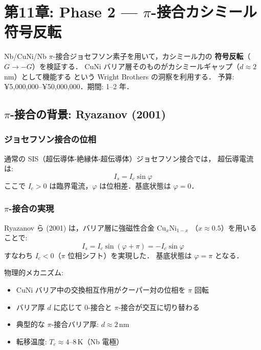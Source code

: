 \newpage
\section{第11章: Phase 2 — $\pi$-接合カシミール符号反転}

\begin{experimentbox}
Nb/CuNi/Nb $\pi$-接合ジョセフソン素子を用いて，カシミール力の
\textbf{符号反転}（$G \to -G$）を検証する．
CuNi バリア層そのものがカシミールギャップ（$d \approx 2$\,nm）として機能する
という Wright Brothers の洞察を利用する．
予算: ¥5,000,000--¥50,000,000．期間: 1--2 年．
\end{experimentbox}

\subsection{$\pi$-接合の背景: Ryazanov (2001)}

\subsubsection{ジョセフソン接合の位相}

通常の SIS（超伝導体-絶縁体-超伝導体）ジョセフソン接合では，
超伝導電流は:
\begin{equation}
I_s = I_c \sin\varphi
\end{equation}
ここで $I_c > 0$ は臨界電流，$\varphi$ は位相差．基底状態は $\varphi = 0$．

\subsubsection{$\pi$-接合の実現}

Ryazanov ら (2001) は，バリア層に強磁性合金 Cu$_x$Ni$_{1-x}$
（$x \approx 0.5$）を用いることで:
\begin{equation}
I_s = I_c \sin(\varphi + \pi) = -I_c \sin\varphi
\end{equation}
すなわち $I_c < 0$（$\pi$ 位相シフト）を実現した．
基底状態は $\varphi = \pi$ となる．

物理的メカニズム:
\begin{itemize}
\item CuNi バリア中の交換相互作用がクーパー対の位相を $\pi$ 回転
\item バリア厚 $d$ に応じて $0$-接合と $\pi$-接合が交互に切り替わる
\item 典型的な $\pi$-接合バリア厚: $d \approx 2$\,nm
\item 転移温度: $T_c \approx 4$--$8$\,K（Nb 電極）
\end{itemize}

